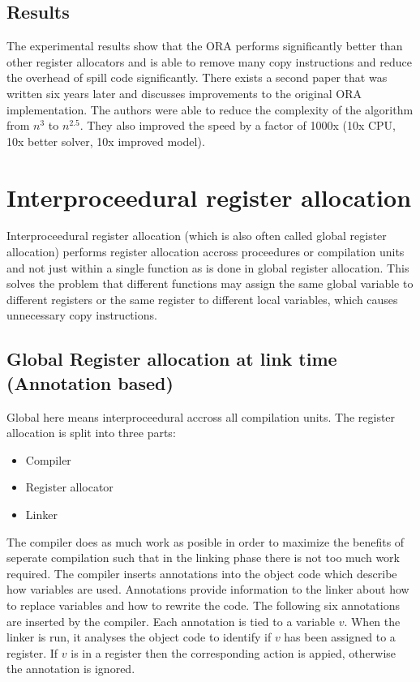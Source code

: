 \documentclass[a4paper,10pt]{article}
\begin{document}
\subsection{Results}
The experimental results show that the ORA performs significantly better than other register allocators and is able to remove many
copy instructions and reduce the overhead of spill code significantly. There exists a second paper that was written six years later and 
discusses improvements to the original ORA implementation. The authors were able to reduce the complexity of the algorithm 
from $n^3$ to $n^{2.5}$. They also improved the speed by a factor of 1000x (10x CPU, 10x better solver, 10x improved model).


\section{Interproceedural register allocation}
Interproceedural register allocation (which is also often called global register allocation) performs register allocation accross
proceedures or compilation units and not just within a single function as is done in global register allocation. This solves the problem
that different functions may assign the same global variable to different registers or the same register to different local variables, 
which causes unnecessary copy instructions.

\subsection{Global Register allocation at link time (Annotation based)}
Global here means interproceedural accross all compilation units. The register allocation is split into three parts:
\begin{itemize}
 \item Compiler
 \item Register allocator
 \item Linker
\end{itemize}
The compiler does as much work as posible in order to maximize the benefits of seperate compilation such that in the linking phase there 
is not too much work required. The compiler inserts annotations into the object code which describe how variables are used. Annotations 
provide information to the linker about how to replace variables and how to rewrite the code. The following six annotations are inserted 
by the compiler. Each annotation is tied to a variable $v$. When the linker is run, it analyses the object code to identify if $v$ has 
been assigned to a register. If $v$ is in a register then the corresponding action is appied, otherwise the annotation is ignored.
\end{document}
